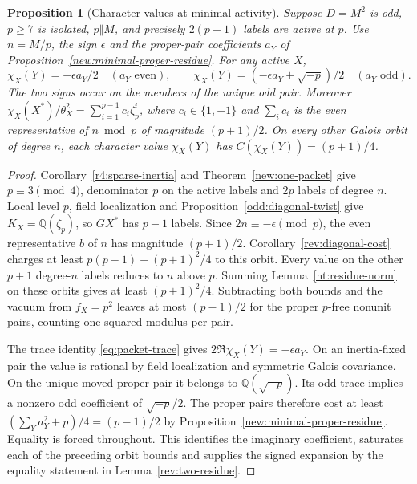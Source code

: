 \documentclass[11pt]{amsart}
\numberwithin{equation}{section}
\newtheorem{proposition}[theorem]{Proposition}
\theoremstyle{definition}
\theoremstyle{plain}
\newcommand{\QQ}{\mathbb Q}
\begin{document}
\begin{proposition}[Character values at minimal activity]\label{rev:minimal-packet}
Suppose $D=M^2$ is odd, $p\ge7$ is isolated, $p\Vert M$, and
precisely $2(p-1)$ labels are active at $p$. Use $n=M/p$, the sign
$\epsilon$ and the proper-pair coefficients $a_Y$ of
Proposition~\ref{new:minimal-proper-residue}. For any active $X$,
\[
 \chi_X(Y)=-\epsilon a_Y/2\quad(a_Y\text{ even}),\qquad
 \chi_X(Y)=(-\epsilon a_Y\pm\sqrt{-p})/2\quad(a_Y\text{ odd}).
\]
The two signs occur on the members of the unique odd pair. Moreover
$\chi_X(X^*)/\theta_X^2=\sum_{i=1}^{p-1}c_i\zeta_p^i$, where
$c_i\in\{1,-1\}$ and $\sum_i c_i$ is the even representative of
$n\bmod p$ of magnitude $(p+1)/2$. On every other Galois orbit of
degree $n$, each character value $\chi_X(Y)$ has
$C(\chi_X(Y))=(p+1)/4$.
\end{proposition}
\begin{proof}
Corollary~\ref{r4:sparse-inertia} and Theorem~\ref{new:one-packet}
give $p\equiv3\pmod4$, denominator $p$ on the active labels and
$2p$ labels of degree $n$. Local level $p$, field localization and
Proposition~\ref{odd:diagonal-twist} give $K_X=\QQ(\zeta_p)$,
so $G X^*$ has $p-1$ labels. Since $2n\equiv-\epsilon\pmod p$,
the even representative $b$ of $n$ has magnitude $(p+1)/2$.
Corollary~\ref{rev:diagonal-cost} charges at least
$p(p-1)-(p+1)^2/4$ to this orbit. Every value on the other $p+1$
degree-$n$ labels reduces to $n$ above $p$. Summing
Lemma~\ref{nt:residue-norm} on these orbits gives at least
$(p+1)^2/4$. Subtracting both bounds and the vacuum from $f_X=p^2$
leaves at most $(p-1)/2$ for the proper $p$-free nonunit pairs,
counting one squared modulus per pair.

The trace identity \eqref{eq:packet-trace} gives
$2\Re\chi_X(Y)=-\epsilon a_Y$. On an inertia-fixed pair the value
is rational by field localization and symmetric Galois covariance.
On the unique moved proper pair it belongs to $\QQ(\sqrt{-p})$.
Its odd trace implies a nonzero odd coefficient of $\sqrt{-p}/2$.
The proper pairs therefore cost at least
$(\sum_Ya_Y^2+p)/4=(p-1)/2$ by
Proposition~\ref{new:minimal-proper-residue}.
Equality is forced throughout. This identifies the imaginary
coefficient, saturates each of the preceding orbit bounds and
supplies the signed expansion by the equality statement in
Lemma~\ref{rev:two-residue}.
\end{proof}
\end{document}
